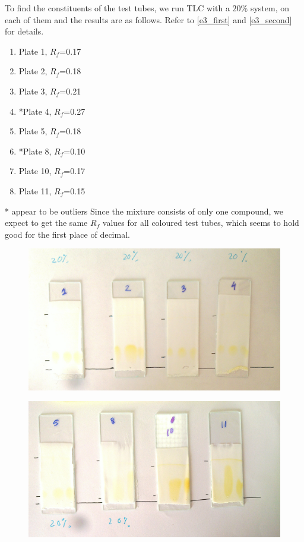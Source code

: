 	To find the constituents of the test tubes, we run TLC with a $20\%$ system, on each of them and the results are as follows. Refer to \autoref{e3_first} and \autoref{e3_second} for details.
	\begin{enumerate}
		\item Plate 1, $R_f$=0.17
		\item Plate 2, $R_f$=0.18
		\item Plate 3, $R_f$=0.21
		\item *Plate 4, $R_f$=0.27
		\item Plate 5, $R_f$=0.18
		\item *Plate 8, $R_f$=0.10
		\item Plate 10, $R_f$=0.17
		\item Plate 11, $R_f$=0.15
	\end{enumerate}
	* appear to be outliers
	Since the mixture consists of only one compound, we expect to get the same $R_f$ values for all coloured test tubes, which seems to hold good for the first place of decimal.
	


	\begin{figure}[bth]
		\begin{center}
			\includegraphics[width=1.2\linewidth]{gfx/e3_first}
		\end{center}
	\caption[TLC plates for various test tubes]{\label{e3_first}}
	\end{figure}

	\begin{figure}[bth]
		\begin{center}
			\includegraphics[width=1.2\linewidth]{gfx/e3_second}
		\end{center}
	\caption[TLC plates for the rest of the test tubes]{\label{e3_second}}
	\end{figure}


